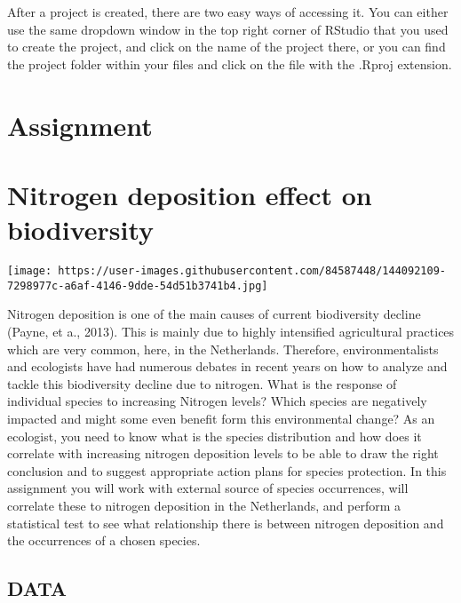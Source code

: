 \documentclass[
]{article}
\begin{document}
After a project is created, there are two easy ways of accessing it. You
can either use the same dropdown window in the top right corner of
RStudio that you used to create the project, and click on the name of
the project there, or you can find the project folder within your files
and click on the file with the .Rproj extension.

\hfill\break

\hypertarget{assignment}{%
\section{Assignment}\label{assignment}}

\hypertarget{nitrogen-deposition-effect-on-biodiversity}{%
\section*{\texorpdfstring{\textbf{Nitrogen deposition effect on
biodiversity}}{Nitrogen deposition effect on biodiversity}}\label{nitrogen-deposition-effect-on-biodiversity}}

\texttt{[image: https://user-images.githubusercontent.com/84587448/144092109-7298977c-a6af-4146-9dde-54d51b3741b4.jpg]}

Nitrogen deposition is one of the main causes of current biodiversity
decline (Payne, et a., 2013). This is mainly due to highly intensified
agricultural practices which are very common, here, in the Netherlands.
Therefore, environmentalists and ecologists have had numerous debates in
recent years on how to analyze and tackle this biodiversity decline due
to nitrogen. What is the response of individual species to increasing
Nitrogen levels? Which species are negatively impacted and might some
even benefit form this environmental change? As an ecologist, you need
to know what is the species distribution and how does it correlate with
increasing nitrogen deposition levels to be able to draw the right
conclusion and to suggest appropriate action plans for species
protection. In this assignment you will work with external source of
species occurrences, will correlate these to nitrogen deposition in the
Netherlands, and perform a statistical test to see what relationship
there is between nitrogen deposition and the occurrences of a chosen
species.

\hypertarget{data}{%
\subsection{DATA}\label{data}}
\end{document}
